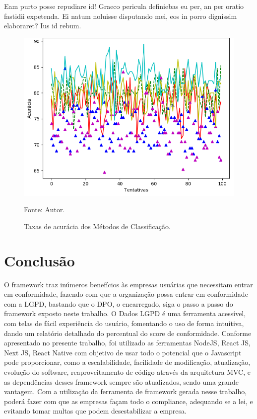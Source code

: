 \documentclass[
	12pt,				%
	openright,			%
	oneside,			%
	a4paper,			%
	english,			%
	french,				%
	spanish,			%
	brazil,				%
	]{abntex2}
\begin{document}
Eam purto posse repudiare id! Graeco pericula definiebas eu per, an per oratio fastidii expetenda. Ei natum noluisse disputando mei, eos in porro dignissim elaboraret? Ius id rebum.
\begin{figure}[ht]
    \centering
    \caption{Taxas de acurácia dos Métodos de Classificação.}
    \includegraphics[width=5.0in]{Images/acc-classification.png}
    \label{fig: grafico-acc}
    
    \centering \small Fonte: Autor.
\end{figure}

 \chapter{Conclusão}
 \label{ch: conclusao}
 O framework traz inúmeros benefícios às empresas usuárias que necessitam entrar em conformidade, fazendo com que a organização possa entrar em conformidade com a LGPD, bastando que o DPO, o encarregado, siga o passo a passo do framework exposto neste trabalho. O Dados LGPD é uma ferramenta acessível, com telas de fácil experiência do usuário, fomentando o uso de forma intuitiva, dando um relatório detalhado do percentual do score de conformidade. Conforme apresentado no presente trabalho, foi utilizado as ferramentas NodeJS, React JS, Next JS, React Native com objetivo de usar todo o potencial que o Javascript pode proporcionar, como a escalabilidade, facilidade de modificação, atualização, evolução do software, reaproveitamento de código através da arquitetura MVC, e as dependências desses framework sempre são atualizados, sendo uma grande vantagem. Com a utilização da ferramenta de framework gerada nesse trabalho, poderá fazer com que as empresas façam todo o compliance, adequando se a lei, e evitando tomar multas que podem desestabilizar a empresa.
\end{document}
